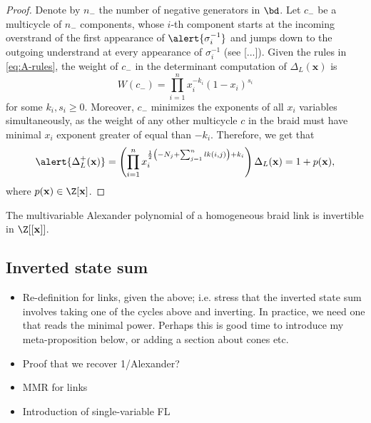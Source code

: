 \documentclass[11pt,e-only]{amsart}
\begin{document}
\begin{proof} Denote by $n_-$ the number of negative generators in $\bd$. Let $c_-$ be a multicycle of $n_-$ components, whose $i$-th component starts at the incoming overstrand of the first appearance of $\alert{\sigma_i^{-1}}$ and jumps down to the outgoing understrand at every appearance of $\sigma_i^{-1}$ (see [...]). Given the rules in \cref{eq:A-rules}, the weight of $c_-$ in the determinant computation of $\Delta_L(\mathbf{x})$ is
\begin{equation}
    W(c_-) = \prod_{i=1}^n x_i^{-k_i} (1-x_i)^{s_i}
\end{equation}
for some $k_i,s_i\geq 0$. Moreover, $c_-$ minimizes the exponents of all $x_i$ variables simultaneously, as the weight of any other multicycle $c$ in the braid must have minimal $x_i$ exponent greater of equal than $-k_i$. Therefore, we get that
\begin{equation}
    \alert{\Delta^+_L(\mathbf{x})}=\left(\prod_{i=1}^nx_i^{\frac12\left(-N_j+\sum_{j=1}^n lk(i,j)\right)+k_i}\right)\Delta_L(\mathbf{x}) = 1+p(\mathbf{x}),
\end{equation} %
where $p(\mathbf{x})\in\Z[\mathbf{x}]$.
\end{proof}

\begin{corollary} The multivariable Alexander polynomial of a homogeneous braid link is invertible in $\Z[[\mathbf{x}]]$.
\end{corollary}

\subsection{Inverted state sum}

\begin{itemize}
    \item Re-definition for links, given the above; i.e. stress that the inverted state sum involves taking one of the cycles above and inverting. In practice, we need one that reads the minimal power. Perhaps this is good time to introduce my meta-proposition below, or adding a section about cones etc.
    \item Proof that we recover 1/Alexander?
    \item MMR for links
    \item Introduction of single-variable FL
\end{itemize}
\end{document}
